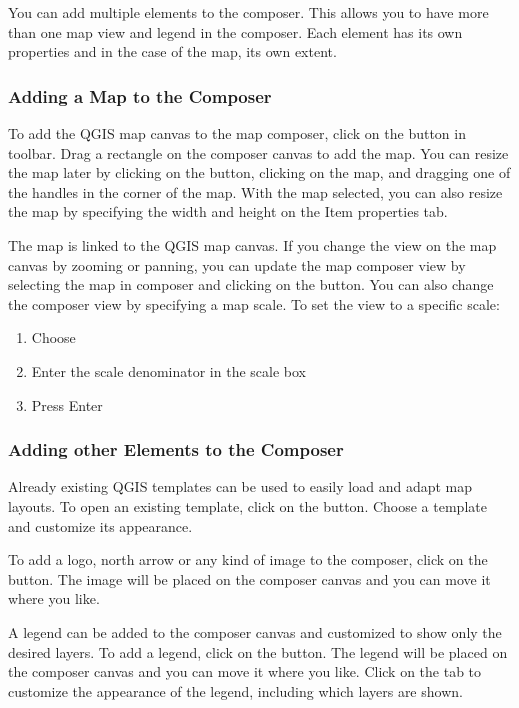 You can add multiple elements to the composer. This allows you to have more
than one map view and legend in the composer. Each element has its own
properties and in the case of the map, its own extent.

\subsubsection{Adding a Map to the Composer}

To add the QGIS map canvas to the map composer, click on the
button in toolbar. Drag a rectangle on the composer canvas to add the
map. You can resize the map later by clicking on the 
button, clicking on the map, and dragging one of the handles in the corner of
the map. With the map selected, you can also resize the map by specifying the
width and height on the Item properties tab.

The map is linked to the QGIS map canvas. If you change the view on the map
canvas by zooming or panning, you can update the map composer view by
selecting the map in composer and clicking on the  button.
You can also change the composer view by specifying a map scale. To set the
view to a specific scale:

\begin{enumerate}
\item Choose 
\item Enter the scale denominator in the scale box
\item Press Enter
\end{enumerate} 

\subsubsection{Adding other Elements to the Composer} 
 
Already existing QGIS templates can be used to easily load and adapt map
layouts. To open an existing template, click on the
button. Choose a template and
customize its appearance. 

To add a logo, north arrow or any  kind of image to the composer, click on
the 
button. The image will 
be placed on the composer canvas and you can move it where you like. 

A legend can be added to the composer canvas and customized to show only the
desired layers. To add a legend, click on the
button. The legend will be
placed on the composer canvas and you can move it where you like. Click on
the  tab to customize the appearance of the legend, including
which layers are shown.

